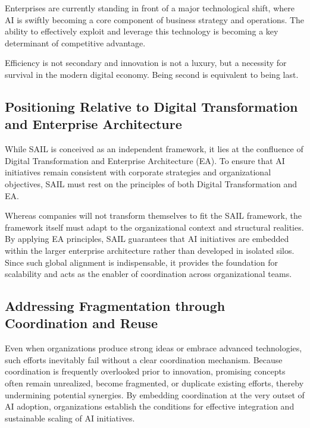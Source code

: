 \documentclass[]{imc-inf}
\begin{document}
Enterprises are currently standing in front of a major technological
shift, where AI is swiftly becoming a core component of business
strategy and operations. The ability to effectively exploit and leverage
this technology is becoming a key determinant of competitive advantage.

Efficiency is not secondary and innovation is not a luxury, but a
necessity for survival in the modern digital economy. Being second is
equivalent to being last.

\subsection{Positioning Relative to Digital Transformation and
	Enterprise
	Architecture}\label{positioning-relative-to-digital-transformation-and-enterprise-architecture}

While SAIL is conceived as an independent framework, it lies at the
confluence of Digital Transformation and Enterprise Architecture (EA).
To ensure that AI initiatives remain consistent with corporate
strategies and organizational objectives, SAIL must rest on the
principles of both Digital Transformation and EA.

Whereas companies will not transform themselves to fit the SAIL
framework, the framework itself must adapt to the organizational context
and structural realities. By applying EA principles, SAIL guarantees
that AI initiatives are embedded within the larger enterprise
architecture rather than developed in isolated silos. Since such global
alignment is indispensable, it provides the foundation for scalability
and acts as the enabler of coordination across organizational teams.

\subsection{Addressing Fragmentation through Coordination and
	Reuse}\label{addressing-fragmentation-through-coordination-and-reuse}

Even when organizations produce strong ideas or embrace advanced
technologies, such efforts inevitably fail without a clear coordination
mechanism. Because coordination is frequently overlooked prior to
innovation, promising concepts often remain unrealized, become
fragmented, or duplicate existing efforts, thereby undermining potential
synergies. By embedding coordination at the very outset of AI adoption,
organizations establish the conditions for effective integration and
sustainable scaling of AI initiatives.
\end{document}
